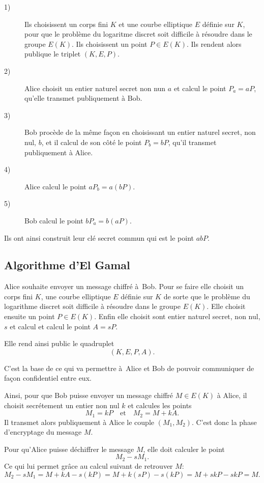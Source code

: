 \begin{description}
    \item[1)] Ils choisissent un corps fini $K$ et une courbe elliptique $E$ définie sur $K$, pour que le problème du logaritme discret soit difficile à résoudre dans le groupe $E(K)$. Ils choisissent un point $P \in E(K)$. Ils rendent alors publique le triplet $(K,E,P)$.

    \item[2)] Alice choisit un entier naturel secret non nun $a$ et calcul le point $P_a=aP$, qu'elle transmet publiquement à Bob.

    \item[3)] Bob procède de la même façon en choisissant un entier naturel secret, non nul, $b$, et il calcul de son côté le point $P_b=bP$, qu'il transmet publiquement à Alice.

    \item[4)] Alice calcul le point $aP_b=a(bP)$.

    \item[5)] Bob calcul le point $bP_a=b(aP)$.
\end{description}

Ils ont ainsi construit leur clé secret commun qui est le point $abP$.

\subsection{Algorithme d'El Gamal}

Alice souhaite envoyer un message chiffré à Bob. Pour se faire elle choisit un corps fini $K$, une courbe elliptique $E$ définie sur $K$ de sorte que le problème du logarithme discret soit difficile à résoudre dans le groupe $E(K)$. Elle choisit ensuite un point $P \in E(K)$. Enfin elle choisit sont entier naturel secret, non nul, $s$ et calcul et calcul le point $A=sP$.

Elle rend ainsi public le quadruplet 
\[
    (K,E,P,A)
.\] 

C'est la base de ce qui va permettre à Alice et Bob de pouvoir communiquer de façon confidentiel entre eux.

Ainsi, pour que Bob puisse envoyer un message chiffré $M \in E(K)$ à Alice, il choisit secrétement un entier non nul $k$ et calcules les points
\[
M_1=kP \quad \text{et} \quad M_2=M+kA
.\] 
Il transmet alors publiquement à Alice le couple $(M_1,M_2)$. C'est donc la phase d'encryptage du message $M$.

Pour qu'Alice puisse déchiffrer le message $M$, elle doit calculer le point
\[
M_2-sM_1
.\] 
Ce qui lui permet grâce au calcul suivant de retrouver $M$:
\[
M_2-sM_1=M+kA-s(kP)=M+k(sP)-s(kP)=M+skP-skP=M
.\] 

